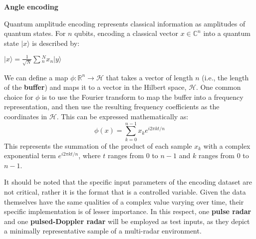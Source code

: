 \textbf{Angle encoding}

Quantum amplitude encoding represents classical information as amplitudes of quantum states.
For $n$ qubits, encoding a classical vector $x \in \mathbb{C}^{n}$ into a quantum state $\vert x \rangle$ is described by:

$|x\rangle = \frac{1}{\sqrt{N}} \sum{_n^N}  x_n \vert y \rangle$


We can define a map $\phi: \mathbb{R}^n \rightarrow \mathcal{H}$ that takes a vector of length $n$ (i.e., the length of the \textbf{buffer}) and maps it to a vector in the Hilbert space, $\mathcal{H}$.
One common choice for $\phi$ is to use the Fourier transform to map the buffer into a frequency representation, and then use the resulting frequency coefficients as the coordinates in $\mathcal{H}$. This can be expressed mathematically as:
\begin{equation}
\phi(x) = \sum_{k=0}^{n-1} x_k e^{i2\pi k t / n}
\end{equation}
This represents the summation of the product of each sample $x_k$ with a complex exponential term $e^{i2\pi k t / n}$, where $t$ ranges from 0 to $n-1$ and $k$ ranges from 0 to $n-1$.

It should be noted that the specific input parameters of the encoding dataset are not critical, rather it is the format that is a controlled variable.
Given the data themselves have the same qualities of a complex value varying over time, their specific implementation is of lesser importance.
In this respect, one \textbf{pulse radar} and one \textbf{pulsed-Doppler radar} will be employed as test inputs, as they depict a minimally representative sample of a multi-radar environment. 

